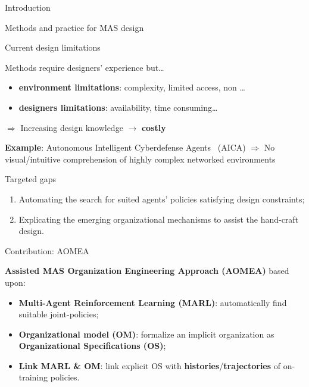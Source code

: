 \begin{frame}[allowframebreaks]{Introduction}
\begin{block}{Methods and practice for MAS design}
    \end{block}

    \begin{alertblock}{Current design limitations}

        Methods require designers' experience but\dots

        \begin{itemize}
            \item \textbf{environment limitations}: complexity, limited access, non \dots
            \item \textbf{designers limitations}: availability, time consuming\dots
        \end{itemize}
        \vspace{1ex}
        $\Longrightarrow$ Increasing design knowledge $\rightarrow$ \textbf{costly}
    \end{alertblock}

    \begin{exampleblock}{\textbf{Example}: Autonomous Intelligent Cyberdefense Agents~\cite{Kott2023} (AICA)}
        $\Longrightarrow$ No visual/intuitive comprehension of highly complex networked environments
    \end{exampleblock}

    \begin{alertblock}{Targeted gaps}
        \begin{enumerate}
            \item Automating the search for suited agents' policies satisfying design constraints;
            \item Explicating the emerging organizational mechanisms to assist the hand-craft design.
        \end{enumerate}
    \end{alertblock}

    \begin{prosblock}{Contribution: AOMEA}

        \textbf{Assisted MAS Organization Engineering Approach (AOMEA)} based upon:
        \begin{itemize}
            \item \textbf{Multi-Agent Reinforcement Learning (MARL)}: automatically find suitable joint-policies;
            \item \textbf{Organizational model (OM)}: formalize an implicit organization as \textbf{Organizational Specifications (OS)};
            \item \textbf{Link MARL \& OM}: link explicit OS with \textbf{histories}/\textbf{trajectories} of on-training policies.
        \end{itemize}


\end{prosblock}
\end{frame}
